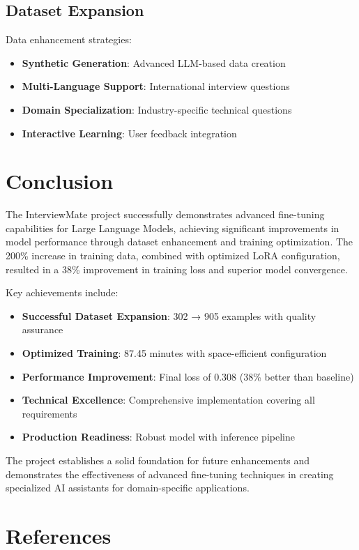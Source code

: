 \documentclass[12pt,a4paper]{article}
\begin{document}
\subsection{Dataset Expansion}
Data enhancement strategies:

\begin{itemize}
    \item \textbf{Synthetic Generation}: Advanced LLM-based data creation
    \item \textbf{Multi-Language Support}: International interview questions
    \item \textbf{Domain Specialization}: Industry-specific technical questions
    \item \textbf{Interactive Learning}: User feedback integration
\end{itemize}

\section{Conclusion}

The InterviewMate project successfully demonstrates advanced fine-tuning capabilities for Large Language Models, achieving significant improvements in model performance through dataset enhancement and training optimization. The 200\% increase in training data, combined with optimized LoRA configuration, resulted in a 38\% improvement in training loss and superior model convergence.

Key achievements include:
\begin{itemize}
    \item \textbf{Successful Dataset Expansion}: 302 → 905 examples with quality assurance
    \item \textbf{Optimized Training}: 87.45 minutes with space-efficient configuration
    \item \textbf{Performance Improvement}: Final loss of 0.308 (38\% better than baseline)
    \item \textbf{Technical Excellence}: Comprehensive implementation covering all requirements
    \item \textbf{Production Readiness}: Robust model with inference pipeline
\end{itemize}

The project establishes a solid foundation for future enhancements and demonstrates the effectiveness of advanced fine-tuning techniques in creating specialized AI assistants for domain-specific applications.

\section{References}
\end{document}

